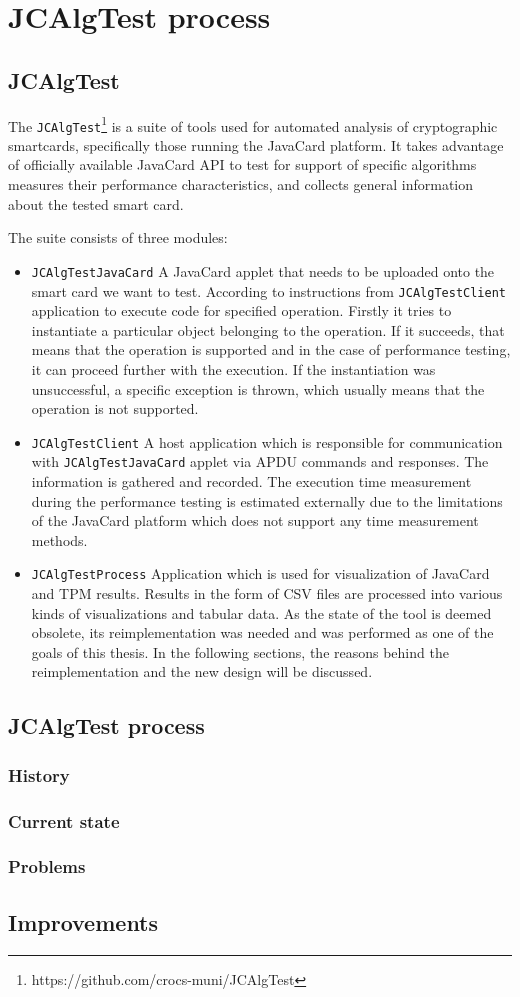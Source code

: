 \chapter{JCAlgTest process}
\section{JCAlgTest}
The \texttt{JCAlgTest}\footnote{https://github.com/crocs-muni/JCAlgTest} is a suite of tools used for automated analysis
of cryptographic smartcards, specifically those running the JavaCard platform. It takes advantage of officially available
JavaCard API to test for support of specific algorithms measures their performance characteristics, and collects general information about the tested smart card.

The suite consists of three modules:
\begin{itemize}
  \item
        \texttt{JCAlgTestJavaCard} A JavaCard applet that needs to be uploaded onto the smart card we want to test. According to instructions from \texttt{JCAlgTestClient} application to execute code for specified operation. Firstly it tries to instantiate a particular object belonging to the operation. If it succeeds, that means that the operation is supported and in the case of performance testing, it can proceed further with the execution. If the instantiation was unsuccessful, a specific exception is thrown, which usually means that the operation is not supported.
  \item
        \texttt{JCAlgTestClient} A host application which is responsible for communication with \texttt{JCAlgTestJavaCard} applet via APDU commands and responses. The information is gathered and recorded. The execution time measurement during the performance testing  is estimated externally due to the limitations of the JavaCard platform which does not support any time measurement methods.
  \item
        \texttt{JCAlgTestProcess} Application which is used for visualization of JavaCard and TPM results. Results in the form of CSV files are processed into various kinds of visualizations and tabular data. As the state of the tool is deemed obsolete, its reimplementation was needed and was performed as one of the goals of this thesis. In the following sections, the reasons behind the reimplementation and the new design will be discussed.
\end{itemize}

\section{JCAlgTest process}
\subsection{History}
\subsection{Current state}
\subsection{Problems}

\section{Improvements}
